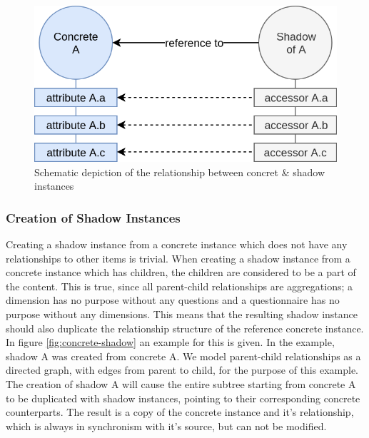 \documentclass[a4paper,11pt]{article}
\begin{document}
                \begin{figure}
                    \centering
                    \includegraphics[width=.48\textwidth]{shadow-concept}
                    \caption{Schematic depiction of the relationship between concret \& shadow instances}
                    \label{fig:shadow-concept}
                \end{figure}

                \subsubsection{Creation of Shadow Instances}
                    Creating a shadow instance from a concrete instance which
                    does not have any relationships to other items is trivial.
                    When creating a shadow instance from a concrete instance
                    which has children, the children are considered to be a part
                    of the content. This is true, since all parent-child
                    relationships are aggregations; a dimension has no purpose
                    without any questions and a questionnaire has no purpose
                    without any dimensions. This means that the resulting shadow
                    instance should also duplicate the relationship structure
                    of the reference concrete instance. In figure \ref{fig:concrete-shadow}
                    an example for this is given. In the example, shadow A
                    was created from concrete A. We model parent-child relationships
                    as a directed graph, with edges from parent to child, for the 
                    purpose of this example. The creation of shadow A will cause the
                    entire subtree starting from concrete A to be duplicated
                    with shadow instances, pointing to their corresponding
                    concrete counterparts. The result is a copy of the
                    concrete instance and it's relationship, which is always
                    in synchronism with it's source, but can not be modified.
\end{document}
